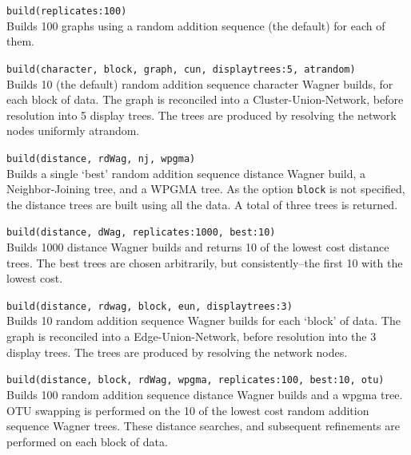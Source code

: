 	\begin{example}
		\item{\texttt{build(replicates:100)} \\
		Builds 100 graphs using a random addition sequence (the default) for each of them.}
		
		\item{\texttt{build(character, block, graph, cun, displaytrees:5, atrandom)}\\
		Builds 10 (the default) random addition sequence character Wagner builds, for each 
		block of data. The graph is reconciled into a Cluster-Union-Network, before resolution 
		into 5 display trees. The trees are produced by resolving the network nodes 
		uniformly atrandom.}
		
		\item{\texttt{build(distance, rdWag, nj, wpgma)} \\ 
		Builds a single `best' random addition sequence distance Wagner build, a Neighbor-Joining 
		tree, and a WPGMA tree. As the option \texttt{block} is not specified, the distance trees 
		are built using all the data. A total of three trees is returned. }
		
		\item{\texttt{build(distance, dWag, replicates:1000, best:10)}\\
		Builds 1000 distance Wagner builds and returns 10 of the lowest cost distance trees.
		The best trees are chosen arbitrarily, but consistently--the first 10 with the lowest cost.}
	
		\item{\texttt{build(distance, rdwag, block, eun, displaytrees:3)}\\
		Builds 10 random addition sequence Wagner builds for each `block' of data. The graph 
		is reconciled into a Edge-Union-Network, before resolution into the 3 display trees. 
		The trees are produced by resolving the network nodes.}
		
		\item{\texttt{build(distance, block, rdWag, wpgma, replicates:100, best:10, otu)}\\
		Builds 100 random addition sequence distance Wagner builds and a wpgma tree. 
		OTU swapping is performed on the 10 of the lowest cost random addition 
		sequence Wagner trees. These distance searches, and subsequent refinements are 
		performed on each block of data.}
	\end{example}

